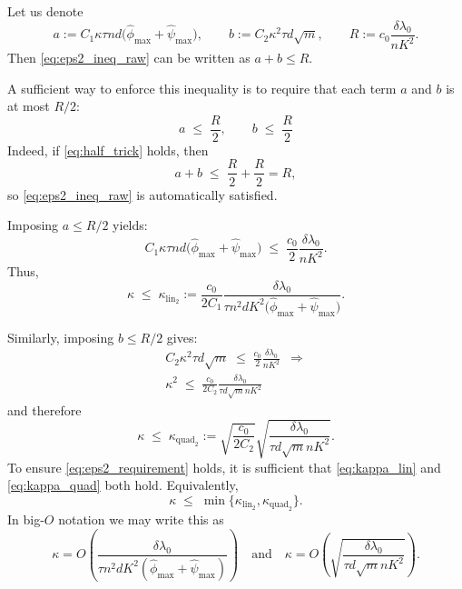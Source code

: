\documentclass[10pt]{article} %
\theoremstyle{definition}
\theoremstyle{plain}
\begin{document}
Let us denote
\[
    a := C_1 \kappa\tau n d\bigl(\hat\phi_{\max}+\hat\psi_{\max}\bigr),
    \qquad
    b := C_2 \kappa^2\tau d\sqrt{m},
    \qquad
    R := c_0 \frac{\delta\lambda_0}{nK^2}.
\]
Then \eqref{eq:eps2_ineq_raw} can be written as $a+b\le R$.

A sufficient way to enforce this inequality is to
require that each term $a$ and $b$ is at most $R/2$:
\begin{equation}
\label{eq:half_trick}
    a \;\le\; \frac{R}{2},
    \qquad
    b \;\le\; \frac{R}{2}
\end{equation}
Indeed, if \eqref{eq:half_trick} holds, then
\[
    a+b \;\le\; \frac{R}{2} + \frac{R}{2} = R,
\]
so \eqref{eq:eps2_ineq_raw} is automatically satisfied.

Imposing $a\le R/2$ yields:
\[
    C_1 \kappa\tau n d\bigl(\hat\phi_{\max}+\hat\psi_{\max}\bigr)
    \;\le\;
    \frac{c_0}{2} \frac{\delta\lambda_0}{nK^2}. 
\]
Thus,
\begin{equation}
\label{eq:kappa_lin}
    \kappa
    \;\le\;
    \kappa_{\mathrm{lin}_2}
    :=
    \frac{c_0}{2C_1} 
    \frac{\delta\lambda_0}{\tau n^2 d K^2\bigl(\hat\phi_{\max}+\hat\psi_{\max}\bigr)}.
\end{equation}

Similarly, imposing $b\le R/2$ gives:
\begin{align*}
    C_2 \kappa^2\tau d\sqrt{m}
    \;\le\;
    \frac{c_0}{2} \frac{\delta\lambda_0}{nK^2} \enspace \Rightarrow \\
    \kappa^2
    \;\le\;
    \frac{c_0}{2C_2} 
    \frac{\delta\lambda_0}{\tau d\sqrt{m} nK^2}
\end{align*}
and therefore
\begin{equation}
\label{eq:kappa_quad}
    \kappa
    \;\le\;
    \kappa_{\mathrm{quad}_2}
    :=
    \sqrt{\frac{c_0}{2C_2}} 
    \sqrt{\frac{\delta\lambda_0}{\tau d\sqrt{m} nK^2}}.
\end{equation}
To ensure \eqref{eq:eps2_requirement} holds, it is sufficient that
\eqref{eq:kappa_lin} and \eqref{eq:kappa_quad} both hold. 
Equivalently,
\[
    \kappa
    \;\le\;
    \min\{\kappa_{\mathrm{lin}_2}, \kappa_{\mathrm{quad}_2}\}.
\]
In big-$O$ notation we may write this as
\begin{equation}
\label{eq:kappa_min_form}
    \kappa
    =
    O\!\left(
        \frac{\delta\lambda_0}{\tau n^2 d K^2(\hat\phi_{\max}+\hat\psi_{\max})}
    \right)
    \quad\text{and}\quad
    \kappa
    =
    O\!\left(
        \sqrt{\frac{\delta\lambda_0}{\tau d\sqrt{m} nK^2}}
    \right).
\end{equation}
\end{document}
